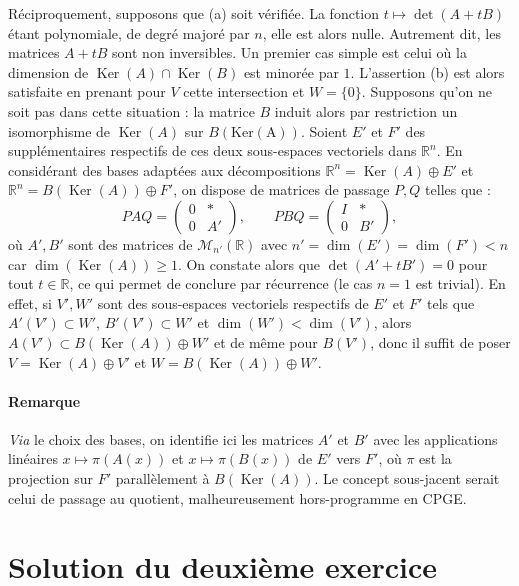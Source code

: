 Réciproquement, supposons que (a) soit vérifiée. La fonction $t \mapsto \det(A + tB)$ étant polynomiale, de degré majoré par $n$, elle est alors nulle. Autrement dit, les matrices $A+tB$ sont non inversibles. Un premier cas simple est celui où la dimension de $\operatorname{Ker}(A) \cap \operatorname{Ker}(B)$ est minorée par $1$. L'assertion (b) est alors satisfaite en prenant pour $V$ cette intersection et $W = \{0\}$. Supposons qu'on ne soit pas dans cette situation :  la matrice $B$ induit alors par restriction un isomorphisme de $\operatorname{Ker}(A)$ sur $B(\operatorname{Ker(A)})$.
Soient $E'$ et $F'$ des supplémentaires respectifs de ces deux sous-espaces vectoriels dans $\mathbb R^n$. En considérant des bases adaptées aux décompositions $\mathbb R^n = \operatorname{Ker}(A)\oplus E'$ et $\mathbb R^n = B(\operatorname{Ker}(A))\oplus F'$, on dispose de matrices de passage $P,Q$  telles que :
\[
PAQ = \begin{pmatrix}0 & *\\0 & A'\end{pmatrix},
\qquad
PBQ = \begin{pmatrix}I & *\\0 & B'\end{pmatrix},
\]
où $A',B'$ sont des matrices de $\mathscr M_{n'}(\mathbb R)$ avec $n' = \dim(E') = \dim(F') < n$ car $\dim(\operatorname{Ker}(A)) \geqslant 1$.
On constate alors que $\det(A' + t B') = 0$ pour tout $t\in\mathbb R$, ce qui permet de conclure par récurrence (le cas $n = 1$ est trivial). En effet, si $V',W'$ sont des sous-espaces vectoriels respectifs de $E'$ et $F'$ tels que $A'(V') \subset W'$, $B'(V') \subset W'$ et $\dim(W') < \dim(V')$, alors $A(V') \subset B(\operatorname{Ker}(A)) \oplus W'$ et de même pour $B(V')$, donc il suffit de poser $V = \operatorname{Ker}(A) \oplus V'$ et $W = B(\operatorname{Ker}(A)) \oplus W'$.

\paragraph{Remarque} \textit{Via} le choix des bases, on identifie ici les matrices $A'$ et $B'$ avec les applications linéaires $x \mapsto \pi(A(x))$ et $x \mapsto \pi(B(x))$ de $E'$ vers $F'$, où $\pi$ est la projection sur $F'$ parallèlement à $B(\operatorname{Ker}(A))$. Le concept sous-jacent serait celui de passage au quotient, malheureusement hors-programme en CPGE.

\section{Solution du deuxième exercice} %


